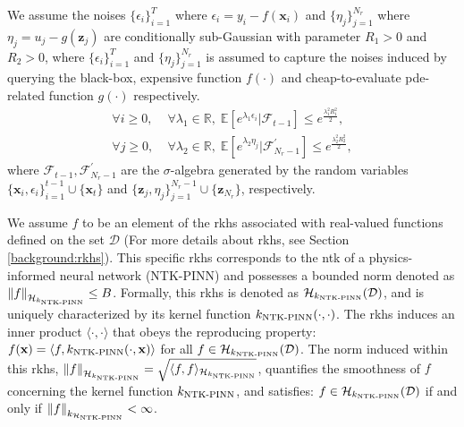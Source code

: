  \begin{assumption}
 \label{assumption:pinn-bo_subgaussian}
 We assume the noises $\{\epsilon_i\}_{i=1}^T$ where $\epsilon_i = y_i - f(\mathbf{x}_i)$ and $\{\eta_j\}_{j=1}^{N_r}$ where $\eta_j = u_j - g(\mathbf{z}_j)$  are conditionally sub-Gaussian with parameter $R_1 > 0$ and $R_2 >0$, where $\{\epsilon_i\}_{i=1}^T$ and $\{\eta_j\}_{j=1}^{N_r}$ is assumed to capture the noises induced by querying the black-box, expensive function $f(\cdot)$  and cheap-to-evaluate \ac{pde}-related function $g(\cdot)$ respectively. 
 \begin{equation*}
     \begin{split}
         \forall i \ge 0, & \; \forall \lambda_1 \in \mathbb{R}, \;  \mathbb{E}[e^{\lambda_1\epsilon_i} \rvert \mathcal{F}_{t-1}] \le e^\frac{\lambda_1^2 R_1^2}{2}, \\
         \forall j \ge 0, & \; \forall \lambda_2 \in \mathbb{R}, \;  \mathbb{E}[e^{\lambda_2\eta_j} \rvert \mathcal{F}_{N_r-1}^\prime] \le e^\frac{\lambda_2^2 R_2^2}{2},
     \end{split}
 \end{equation*}
where $\mathcal{F}_{t-1}, \mathcal{F}_{N_r-1}^\prime$ are the $\sigma$-algebra generated by the random variables $\{\mathbf{x}_i, \epsilon_i\} 
^{t-1}_{i=1} \cup \{\mathbf{x}_t\}$ and $\{\mathbf{z}_j, \eta_j\} 
^{N_r-1}_{j=1} \cup \{\mathbf{z}_{N_r}\}$, respectively.
 \end{assumption}
 \begin{assumption}
    \label{assumption:pinn-bo_rkhs}
     We assume $f$ to be an element of the \acf{rkhs} associated with real-valued functions defined on the set $\mathcal{D}$ (For more details about \ac{rkhs}, see Section \ref{background:rkhs}). This specific \ac{rkhs} corresponds to the \acf{ntk} of a physics-informed neural network (NTK-PINN) and possesses a bounded norm denoted as $\norm{f}_{\mathcal{H}_{k_\textup{NTK-PINN}}} \leq B$.  Formally, this \ac{rkhs} is denoted as $\mathcal{H}_{k_\textup{NTK-PINN}}(\mathcal D)$, and is uniquely characterized by its kernel function $k_\textup{NTK-PINN}(\cdot, \cdot)$. The \ac{rkhs} induces an inner product $\langle \cdot, \cdot \rangle$ that obeys the reproducing property:
    $f(\mathbf{x}) = \langle f, k_\textup{NTK-PINN}(\cdot, \mathbf{x})\rangle$ for all $f \in  \mathcal{H}_{k_\textup{NTK-PINN}}(\mathcal{D})$. 
    The norm induced within this \ac{rkhs}, $\norm{f}_{\mathcal{H}_{k_\textup{NTK-PINN}}} = \sqrt{\langle f,f\rangle_{\mathcal{H}_{k_\textup{NTK-PINN}}}}$, quantifies the smoothness of $f$ concerning the kernel function $k_\textup{NTK-PINN}$, and satisfies: $f \in \mathcal{H}_{k_\textup{NTK-PINN}}(\mathcal{D})$ if and only if $\norm{f}_{k_{\mathcal{H}_\textup{NTK-PINN}}} < \infty$. 
 \end{assumption}


